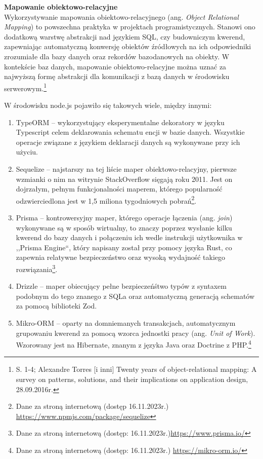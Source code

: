 \documentclass[12pt, a4paper, twoside, openany]{book}
\newcommand{\forceindent}{\leavevmode{\parindent=1.3em\indent}}
\begin{document}
\textbf{Mapowanie obiektowo-relacyjne\\}
\forceindent Wykorzystywanie mapowania obiektowo-relacyjnego (ang. \textit{Object Relational Mapping}) to powszechna praktyka w projektach programistycznych.
Stanowi ono dodatkową warstwę abstrakcji nad językiem SQL, czy budowniczym kwerend, zapewniając automatyczną konwersję obiektów źródłowych na ich odpowiedniki zrozumiałe dla bazy danych oraz rekordów bazodanowych na obiekty.
W kontekście baz danych, mapowanie obiektowo-relacyjne można uznać za najwyższą formę abstrakcji dla komunikacji z bazą danych w środowisku serwerowym.\footnote{S. 1-4; Alexandre Torres [i inni] Twenty years of object-relational mapping: A survey on patterns, solutions, and their implications on application design, 28.09.2016r.}

W środowisku node.js pojawiło się takowych wiele, między innymi:
\begin{enumerate}[label=--]
    \item TypeORM -- wykorzystujący eksperymentalne dekoratory w języku Typescript celem deklarowania schematu encji w bazie danych. Wszystkie operacje związane z językiem deklaracji danych są wykonywane przy ich użyciu.
    \item Sequelize -- najstarszy na tej liście maper obiektowo-relacyjny, pierwsze wzmianki o nim na witrynie StackOverflow sięgają roku 2011. Jest on dojrzałym, pełnym funkcjonalności maperem, którego popularność odzwierciedlona jest w 1,5 miliona tygodniowych pobrań\footnote{Dane za stroną internetową (dostęp 16.11.2023r.) \url{https://www.npmjs.com/package/sequelize}}.
    \item Prisma -- kontrowersyjny maper, którego operacje łączenia (ang. \textit{join}) wykonywane są w sposób wirtualny, to znaczy poprzez wysłanie kilku kwerend do bazy danych i połączeniu ich wedle instrukcji użytkownika w ,,Prisma Engine``, który napisany został przy pomocy języka Rust, co zapewnia relatywne bezpieczeństwo oraz wysoką wydajność takiego rozwiązania\footnote{Dane za stroną internetową (dostęp: 16.11.2023r.)\url{https://www.prisma.io/}}.
    \item Drizzle -- maper obiecujący pełne bezpieczeńśtwo typów z syntaxem podobnym do tego znanego z SQLa oraz automatyczną generacją schematów za pomocą biblioteki Zod.
    \item Mikro-ORM -- oparty na domniemanych transakcjach, automatycznym grupowaniu kwerend za pomocą wzorca jednostki pracy (ang. \textit{Unit of Work}). Wzorowany jest na Hibernate, znanym z języka Java oraz Doctrine z PHP.\footnote{Dane za stroną internetową (dostęp: 16.11.2023r.) \url{https://mikro-orm.io/}}
\end{enumerate}
\end{document}

